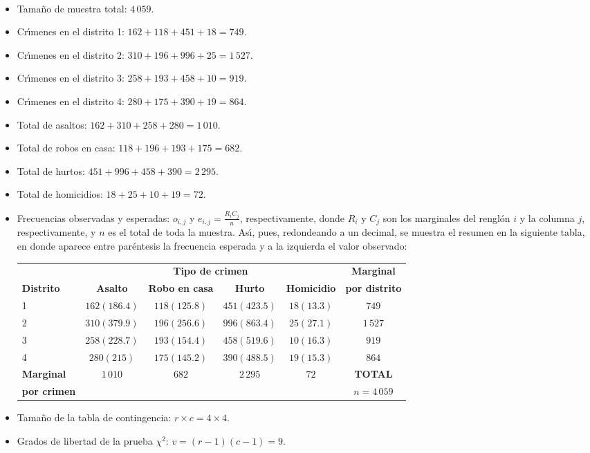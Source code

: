 \begin{solucion}
 \begin{datos}
  $\phantom{0}$
  \begin{itemize}
   \item Tamaño de muestra total: $4\,059$.
   \item Cr\'{\i}menes en el distrito 1: $162 + 118 + 451 + 18 = 749$.
   \item Cr\'{\i}menes en el distrito 2: $310 + 196 + 996 + 25 = 1\,527$.
   \item Cr\'{\i}menes en el distrito 3: $258 + 193 + 458 + 10 = 919$.
   \item Cr\'{\i}menes en el distrito 4: $280 + 175 + 390 + 19 = 864$.
   \item Total de asaltos: $162 + 310 + 258 + 280 = 1\,010$.
   \item Total de robos en casa: $118 + 196 + 193 + 175 = 682$.
   \item Total de hurtos: $451 + 996 + 458 + 390 = 2\,295$.
   \item Total de homicidios: $18 + 25 + 10 + 19 = 72$.
   \item Frecuencias observadas y esperadas: $o_{i,j}$
   y $e_{i,j}=\frac{R_i C_j}{n}$, respectivamente,
   donde $R_i$ y $C_j$ son los marginales del rengl\'on $i$ y la columna $j$,
   respectivamente, y $n$ es el total de toda la muestra.
   As\'{\i}, pues, redondeando a un decimal, se muestra el resumen 
   en la siguiente tabla,
   en donde aparece entre par\'entesis la frecuencia esperada
   y a la izquierda el valor observado:
   \begin{center}
    \begin{tabular}{lcccc|c}
     & \multicolumn{4}{c}{\textbf{Tipo de crimen}} &
     \textbf{Marginal} \\
     \cline{2-5}
     \textbf{Distrito} & \textbf{Asalto} & \textbf{Robo en casa} &
     \textbf{Hurto} & \textbf{Homicidio} & \textbf{por distrito} \\
     \hline 
     1 & $162 (186.4)$ & $118 (125.8)$ & $451 (423.5)$ & $18 (13.3)$ &
     $749$ \\
     2 & $310 (379.9)$ & $196 (256.6)$ & $996 (863.4)$ & $25 (27.1)$ &
     $1\,527$ \\
     3 & $258 (228.7)$ & $193 (154.4)$ & $458 (519.6)$ & $10 (16.3)$ &
     $919$ \\
     4 & $280 (215)$ & $175 (145.2)$ & $390 (488.5)$ & $19 (15.3)$ &
     $864$ \\
     \hline 
     \textbf{Marginal} & \multirow{2}{*}{$1\,010$} &
     \multirow{2}{*}{$682$} & \multirow{2}{*}{$2\,295$} &
     \multirow{2}{*}{$72$} & \textbf{TOTAL} \\
     \textbf{por crimen} & & & & & $n=4\,059$
    \end{tabular}
   \end{center}
   \item Tama\~no de la tabla de contingencia: $r\times c = 4\times 4$.
   \item Grados de libertad de la prueba $\chi^2$: $v = (r-1)(c-1) = 9$.
  \end{itemize}
 \end{datos}
 

\end{solucion}
